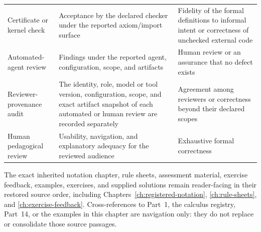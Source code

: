 \begin{landscape}
\begin{longtable}{@{}p{1.40in}p{2.35in}p{3.35in}@{}}
Certificate or kernel check & Acceptance by the declared checker under the
reported axiom/import surface & Fidelity of the formal definitions to informal
intent or correctness of unchecked external code \\ \addlinespace
Automated-agent review & Findings under the reported agent, configuration,
scope, and artifacts & Human review or an assurance that no defect exists \\
\addlinespace
Reviewer-provenance audit & The identity, role, model or tool version,
configuration, scope, and exact artifact snapshot of each automated or human
review are recorded separately & Agreement among reviewers or correctness
beyond their declared scopes \\ \addlinespace
Human pedagogical review & Usability, navigation, and explanatory adequacy for
the reviewed audience & Exhaustive formal correctness \\ \bottomrule
\end{longtable}
\endgroup
\end{landscape}

The exact inherited notation chapter, rule sheets, assessment material,
exercise feedback, examples, exercises, and supplied solutions remain
reader-facing in their restored source order, including
Chapters~\ref{ch:registered-notation}, \ref{ch:rule-sheets}, and
\ref{ch:exercise-feedback}.  Cross-references to Part~1, the calculus registry,
Part~14, or the examples in this chapter are navigation only: they do not
replace or consolidate those source passages.
